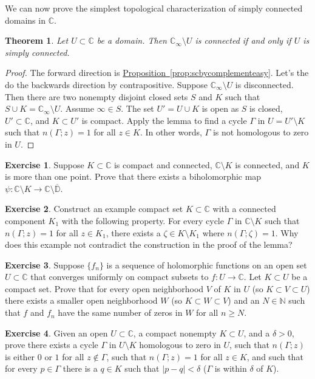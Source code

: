 \documentclass[12pt,openany]{book}
\newcommand{\sabs}[1]{\lvert {#1} \rvert}
\newcommand{\C}{{\mathbb{C}}}
\newcommand{\N}{{\mathbb{N}}}
\newcommand{\D}{{\mathbb{D}}}
\theoremstyle{plain}
\newtheorem{thm}{Theorem}[section]
\theoremstyle{remark}
\theoremstyle{definition}
\newenvironment{exbox}{%
    \def\FrameCommand{\vrule width 1pt \relax\hspace{10pt}}%
    \MakeFramed{\advance\hsize-\width\FrameRestore}%
}{%
    \endMakeFramed
}
\theoremstyle{exercise}
\newtheorem{exercise}{Exercise}[section]
\theoremstyle{example}
\newcommand{\propref}[1]{\hyperref[#1]{Proposition~\ref*{#1}}}
\begin{document}
We can now prove the simplest
topological characterization of simply connected domains in $\C$.

\begin{thm} \label{cor:scbycomplementhard}
Let $U \subset \C$ be a domain.  Then
$\C_\infty \setminus U$ is connected if and only if $U$ is simply connected.
\end{thm}

\begin{proof}
The forward direction is \propref{prop:scbycomplementeasy}.  Let's the do
the backwards direction by contrapositive.  Suppose $\C_\infty
\setminus U$ is disconnected.  Then there are two nonempty disjoint closed
sets $S$ and $K$ such that $S \cup K = \C_\infty \setminus U$. 
Assume $\infty \in S$.
The set $U' = U \cup K$ is open as $S$ is closed, $U' \subset \C$,
and $K \subset U'$ is compact.  Apply the lemma to find a cycle
$\Gamma$ in $U = U' \setminus K$ such that $n(\Gamma;z) = 1$ for all $z \in
K$.  In other words, $\Gamma$ is not homologous to zero in $U$.
\end{proof}

\begin{exbox}
\begin{exercise}
Suppose $K \subset \C$ is compact and connected, $\C \setminus K$ is
connected, and $K$ is more than one point.
Prove that there exists a biholomorphic
map $\psi \colon \C \setminus K \to \C \setminus \overline{\D}$.
\end{exercise}

\begin{exercise}
Construct an example compact set $K \subset \C$ with a connected component $K_1$
with the following property.
For every cycle $\Gamma$ in $\C \setminus K$ such that $n(\Gamma;z)=1$ for
all $z \in K_1$,
there exists a $\zeta \in K \setminus K_1$ where $n(\Gamma;\zeta)=1$.
Why does this example not contradict the construction in the proof of the lemma?
\end{exercise}

\begin{exercise}
Suppose $\{ f_n \}$ is a sequence of holomorphic functions on an open set
$U \subset \C$ that converges uniformly on compact subsets to
$f \colon U \to \C$.  Let $K \subset U$ be a compact set.  Prove that
for every open neighborhood $V$ of $K$ in $U$ (so $K \subset V \subset U$) there exists
a smaller open neighborhood $W$ (so $K \subset W \subset V$) and an $N \in \N$
such that $f$ and $f_n$ have the same number of zeros in $W$ for all
$n \geq N$.
\end{exercise}

\begin{exercise}
Given an open $U \subset \C$, a compact nonempty $K \subset U$, and a $\delta > 0$,
prove there
exists a cycle $\Gamma$ in $U \setminus K$ homologous to zero in $U$,
such that $n(\Gamma;z)$ is either $0$ or $1$ for all $z \notin \Gamma$,
such that
$n(\Gamma;z) = 1$ for all $z \in K$, 
and such that for every $p \in \Gamma$ there is a $q \in K$ such that
$\sabs{p-q} < \delta$ ($\Gamma$ is within $\delta$ of $K$).
\end{exercise}
\end{exbox}
\end{document}
